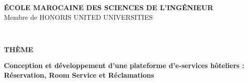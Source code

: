 \documentclass[12pt,a4paper]{report}
\begin{document}
\begin{titlepage}
    \thispagestyle{empty}

    \vspace{0.5cm}

    \noindent
    \colorbox{emsigreen}{
        \begin{minipage}{\textwidth}
            \raggedleft
            \vspace{4pt}
            \color{white}\textbf{\Large ÉCOLE MAROCAINE DES SCIENCES DE L'INGÉNIEUR}\\[2pt]
            {\small\color{white} Membre de HONORIS UNITED UNIVERSITIES}
            \vspace{4pt}
        \end{minipage}
    }

    \vspace{2cm}

    \begin{flushright}
        \colorbox{emsigreen}{
            \begin{minipage}{7cm}
                \centering
                \vspace{4pt}
                \\[4pt]
                \color{white}{\Large 2025-2026}
                \vspace{4pt}
            \end{minipage}
        }
    \end{flushright}

    \vspace{1.5cm}

    \noindent\textbf{\Large THÈME}\dotfill

    \vspace{0.5cm}

    \noindent
    \begin{minipage}{0.95\textwidth}
        \centering
        {\Large \textbf{Conception et développement d'une plateforme
        d'e-services hôteliers : Réservation, Room Service et
        Réclamations}}
    \end{minipage}

    \vspace{1.5cm}

    \\[2pt]
    \noindent{\color{emsigreen}\rule{0.6\textwidth}{2pt}}


\end{titlepage}
\end{document}
